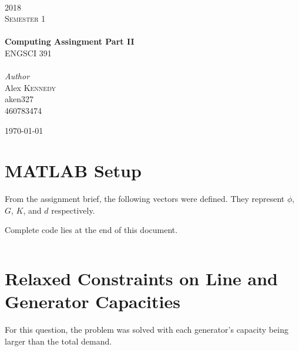 \documentclass[11pt]{article}
\begin{document}
\begin{titlepage}
	\newcommand{\HRule}{\rule{\linewidth}{0.5mm}} %

	\center


	\textsc{\LARGE }\\[1.5cm]
	\textsc{\Large 2018}\\[0.5cm]
	\textsc{\large Semester 1}\\[1cm]

	{
	}\\[0.4cm]

	{\huge\bfseries Computing Assingment Part II}\\[0.6cm]
	{\large ENGSCI 391}\\[1cm]

	{
	}\\[1cm]

	{\large\textit{Author}}\\
	Alex \textsc{Kennedy\\[1cm]}
	aken327\\
	460783474

	\vfill\vfill\vfill
	{\large\today}
	\vfill

\end{titlepage}

\section*{MATLAB Setup}

From the assignment brief, the following vectors were defined. They represent $\phi$, $G$, $K$, and $d$ respectively. 

Complete code lies at the end of this document.

\inputminted[firstline=1, lastline=4]{matlab}{main.m}

\section*{Relaxed Constraints on Line and Generator Capacities}
For this question, the problem was solved with each generator's capacity being larger than the total demand.
\end{document}
